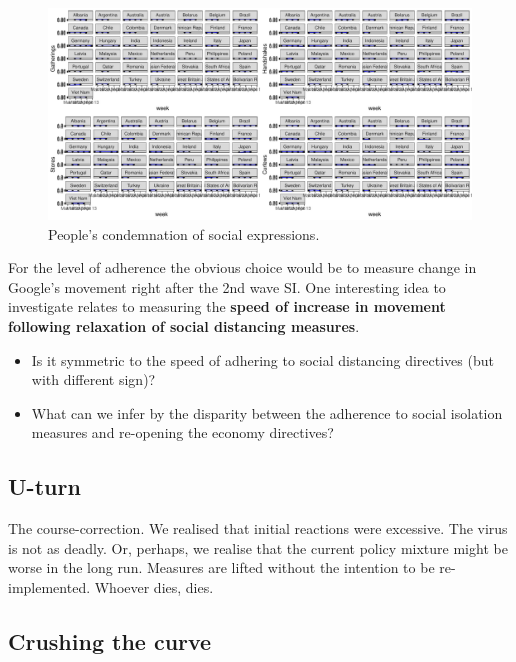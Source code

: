 \documentclass[
  english,
  ,doc,floatsintext]{apa6}
\providecommand{\tightlist}{%
  \setlength{\itemsep}{0pt}\setlength{\parskip}{0pt}}
\begin{document}
\begin{figure}
\centering
\includegraphics{covid-19_2_files/figure-latex/fob-1.pdf}
\caption{\label{fig:fob}People's condemnation of social expressions.}
\end{figure}

For the level of adherence the obvious choice would be to measure change in Google's movement right after the 2nd wave SI.
One interesting idea to investigate relates to measuring the \textbf{speed of increase in movement following relaxation of social distancing measures}.

\begin{itemize}
\tightlist
\item
  Is it symmetric to the speed of adhering to social distancing directives (but with different sign)?
\item
  What can we infer by the disparity between the adherence to social isolation measures and re-opening the economy directives?
\end{itemize}

\hypertarget{u-turn}{%
\subsection{U-turn}\label{u-turn}}

The course-correction. We realised that initial reactions were excessive. The virus is not as deadly. Or, perhaps, we realise that the current policy mixture might be worse in the long run. Measures are lifted without the intention to be re-implemented. Whoever dies, dies.

\hypertarget{crushing-the-curve}{%
\subsection{Crushing the curve}\label{crushing-the-curve}}
\end{document}
